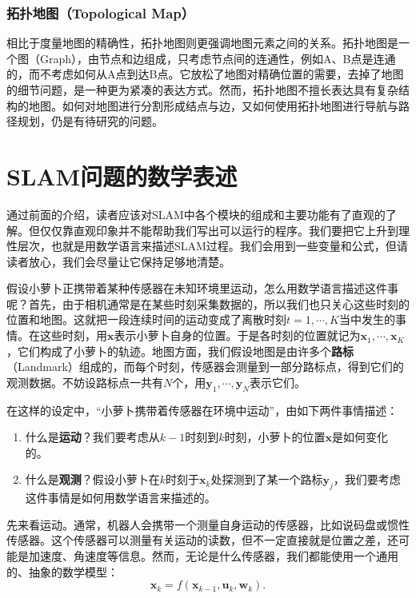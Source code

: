 \subsubsection{拓扑地图（Topological Map）}
相比于度量地图的精确性，拓扑地图则更强调地图元素之间的关系。拓扑地图是一个图（Graph），由节点和边组成，只考虑节点间的连通性，例如A、B点是连通的，而不考虑如何从A点到达B点。它放松了地图对精确位置的需要，去掉了地图的细节问题，是一种更为紧凑的表达方式。然而，拓扑地图不擅长表达具有复杂结构的地图。如何对地图进行分割形成结点与边，又如何使用拓扑地图进行导航与路径规划，仍是有待研究的问题。

\section{SLAM问题的数学表述}

通过前面的介绍，读者应该对SLAM中各个模块的组成和主要功能有了直观的了解。但仅仅靠直观印象并不能帮助我们写出可以运行的程序。我们要把它上升到理性层次，也就是用数学语言来描述SLAM过程。我们会用到一些变量和公式，但请读者放心，我们会尽量让它保持足够地清楚。

假设小萝卜正携带着某种传感器在未知环境里运动，怎么用数学语言描述这件事呢？首先，由于相机通常是在某些时刻采集数据的，所以我们也只关心这些时刻的位置和地图。这就把一段连续时间的运动变成了离散时刻$t=1, \cdots, K$当中发生的事情。在这些时刻，用$\bm{x}$表示小萝卜自身的位置。于是各时刻的位置就记为$ \bm{x}_1, \cdots, \bm{x}_K$，它们构成了小萝卜的轨迹。地图方面，我们假设地图是由许多个\textbf{路标}（Landmark）组成的，而每个时刻，传感器会测量到一部分路标点，得到它们的观测数据。不妨设路标点一共有$N$个，用$\bm{y}_1, \cdots, \bm{y}_N$表示它们。

在这样的设定中，“小萝卜携带着传感器在环境中运动”，由如下两件事情描述：

\begin{enumerate}
	\item 什么是\textbf{运动}？我们要考虑从$k-1$时刻到$k$时刻，小萝卜的位置$\bm{x}$是如何变化的。
	\item 什么是\textbf{观测}？假设小萝卜在$k$时刻于$\bm{x}_k$处探测到了某一个路标$\bm{y}_j$，我们要考虑这件事情是如何用数学语言来描述的。
\end{enumerate}

先来看运动。通常，机器人会携带一个测量自身运动的传感器，比如说码盘或惯性传感器。这个传感器可以测量有关运动的读数，但不一定直接就是位置之差，还可能是加速度、角速度等信息。然而，无论是什么传感器，我们都能使用一个通用的、抽象的数学模型：
\begin{equation}	
{\bm{x}_k} = f\left( {{\bm{x}_{k - 1}},{\bm{u}_k}, \bm{w}_k} \right).
\end{equation}

